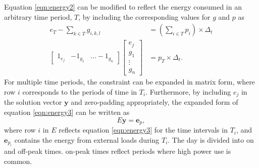 Equation \ref{eqn:energy2} can be modified to reflect the energy consumed in an arbitrary time period, $T$, by including the corresponding values for $g$ and $p$ as
\begin{equation}\label{eqn:energy3}
	\begin{aligned}
	e_T -\sum_{k\in T}g_{i,k,l} &= \left ( \sum_{i\in T}p_i \right ) \times \Delta_t \\
	\begin{bmatrix} 1_{e_j} & -1_{g_1} & \hdots -1_{g_n} \end{bmatrix} \begin{bmatrix}e_j \\ g_1 \\ \vdots \\ g_n \end{bmatrix} &= p_T \times \Delta_t.
	\end{aligned}
\end{equation}
For multiple time periods, the constraint can be expanded in matrix form, where row $i$ corresponds to the periods of time in $T_i$. Furthermore, by including $e_j$ in the solution vector $\mathbf{y}$ and zero-padding appropriately, the expanded form of equation \ref{eqn:energy3} can be written as  
\begin{equation}
	E\mathbf{y} = \mathbf{e}_p,
\end{equation}
where row $i$ in $E$ reflects equation \ref{eqn:energy3} for the time intervals in $T_i$, and $\mathbf{e}_{p_i}$ contains the energy from external loads during $T_i$.
The day is divided into on and off-peak times.  on-peak times reflect periods where high power use is common.
